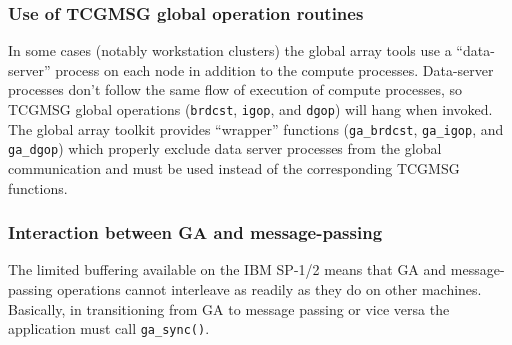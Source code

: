\subsubsection{Use of TCGMSG global operation routines}

In some cases (notably workstation clusters) the global array tools
use a ``data-server'' process on each node in addition to the compute
processes.  Data-server processes don't follow the same flow of
execution of compute processes, so TCGMSG global operations
(\verb+brdcst+, \verb+igop+, and \verb+dgop+) will hang when invoked.
The global array toolkit provides ``wrapper'' functions
(\verb+ga_brdcst+, \verb+ga_igop+, and \verb+ga_dgop+) which properly
exclude data server processes from the global communication and must
be used instead of the corresponding TCGMSG functions.

\subsubsection{Interaction between GA and message-passing}

The limited buffering available on the IBM SP-1/2 means that GA and
message-passing operations cannot interleave as readily as they do on
other machines.  Basically, in transitioning from GA to message
passing or vice versa the application must call {\tt ga\_sync()}.
